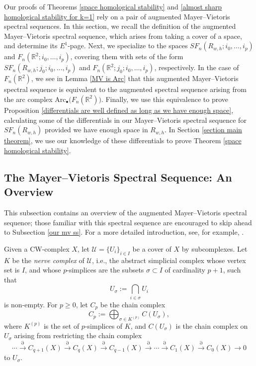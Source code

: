 \documentclass[pagebackref,colorlinks,citecolor=blue,linkcolor=blue,urlcolor=blue,filecolor=blue]{article}
\theoremstyle{definition}\newtheorem{definition}[thm]{Definition}
\theoremstyle{definition}
\newcommand{\R}{\ensuremath{\mathbb{R}}}
\begin{document}
Our proofs of Theorems \ref{space homological stability} and \ref{almost sharp homological stability for k=1} rely on a pair of augmented Mayer--Vietoris spectral sequences.
In this section, we recall the definition of the augmented Mayer--Vietoris spectral sequence, which arises from taking a cover of a space, and determine its $E^{1}$-page.
Next, we specialize to the spaces $SF_{n}(R_{w,h}; i_{0}, \dots, i_{p})$ and $F_{n}(\R^{2}; i_{0}, \dots, i_{p})$, covering them with sets of the form $SF_{n}(R_{w,h}; j_{0} ; i_{0}, \dots, i_{p})$ and $F_{n}(\R^{2}; j_{0};i_{0}, \dots, i_{p})$, respectively.
In the case of $F_{n}(\R^{2})$, we see in Lemma \ref{MV is Arc} that this augmented Mayer--Vietoris spectral sequence is equivalent to the augmented spectral sequence arising from the arc complex $\text{Arc}_{\bullet}\big(F_{n}(\R^{2})\big)$.
Finally, we use this equivalence to prove Proposition \ref{differentials are well defined as long as we have enough space},  calculating some of the differentials in our Mayer--Vietoris spectral sequence for $SF_{n}(R_{w,h})$ provided we have enough space in $R_{w,h}$.
In Section \ref{section main theorem}, we use our knowledge of these differentials to prove Theorem \ref{space homological stability}.

\subsection{The Mayer--Vietoris Spectral Sequence: An Overview}\label{defn of mv ss section}
This subsection contains an overview of the augmented Mayer--Vietoris spectral sequence; those familiar with this spectral sequence are encouraged to skip ahead to Subsection \ref{our mv ss}.
For a more detailed introduction, see, for example, \cite[Chapter VII.4]{brown2012cohomology}.

Given a  CW-complex $X$, let $\mathcal{U}=\{U_{i}\}_{i\in I}$ be a cover of $X$ by subcomplexes.
Let $K$ be the \emph{nerve complex} of $\mathcal{U}$, i.e., the abstract simplicial complex whose vertex set is $I$, and whose $p$-simplices are the subsets $\sigma\subset I$ of cardinality $p+1$, such that
\[
U_{\sigma}:=\bigcap_{i\in \sigma}U_{i}
\]
is non-empty.
For $p\ge 0$, let $C_{p}$ be the chain complex
\[
C_{p}:=\bigoplus_{\sigma\in K^{(p)}}C(U_{\sigma}),
\]
where $K^{(p)}$ is the set of $p$-simplices of $K$, and $C(U_{\sigma})$ is the chain complex on $U_{\sigma}$ arising from restricting the chain complex
\[
\cdots\xrightarrow{\partial} C_{q+1}(X)\xrightarrow{\partial} C_{q}(X)\xrightarrow{\partial} C_{q-1}(X)\xrightarrow{\partial} \cdots\xrightarrow{\partial}C_{1}(X)\xrightarrow{\partial} C_{0}(X)\to 0
\]
to $U_{\sigma}$.
\end{document}
